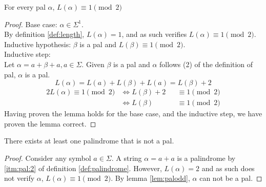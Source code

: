 \documentclass[docid=TP01]{tcom_TP}
\begin{document}
\begin{lemma}
\label{lem:palodd}
	For every pal $\alpha$, $L(\alpha) \equiv 1 \pmod{2}$
\end{lemma}
\begin{proof}
Base case: $\alpha\in\Sigma^1$.\\
By definition \ref{def:length}, $L(\alpha)=1$, and as such verifies $L(\alpha) \equiv 1 \pmod{2}$.\\
Inductive hypothesis: $\beta$ is a pal and $L(\beta) \equiv 1 \pmod{2}$.\\
Inductive step:\\
Let $\alpha=a+\beta+a, a\in\Sigma$. Given $\beta$ is a pal and $\alpha$ follows (2) of the definition of pal, $\alpha$ is a pal.
\begin{equation*}
	L(\alpha)=L(a)+L(\beta)+L(a)=L(\beta)+2
\end{equation*}
\begin{alignat*}{2}
	L(\alpha) \equiv 1 \pmod{2} &\iff L(\beta)+2 &&\equiv 1 \pmod{2} \\
		                        &\iff L(\beta)   &&\equiv 1 \pmod{2}
\end{alignat*}
Having proven the lemma holds for the base case, and the inductive step, we have proven the lemma correct.
\end{proof}
\begin{theorem}
	There exists at least one palindrome that is not a pal.
\end{theorem}
\begin{proof}
	Consider any symbol $a\in\Sigma$. A string $\alpha=a+a$ is a palindrome by \eqref{itm:pal:2} of definition \ref{def:palindrome}. However, $L(\alpha)=2$ and as such does not verify $\alpha$, $L(\alpha) \equiv 1 \pmod{2}$. By lemma \eqref{lem:palodd}, $\alpha$ can not be a pal.
\end{proof}
\pagebreak
\end{document}
